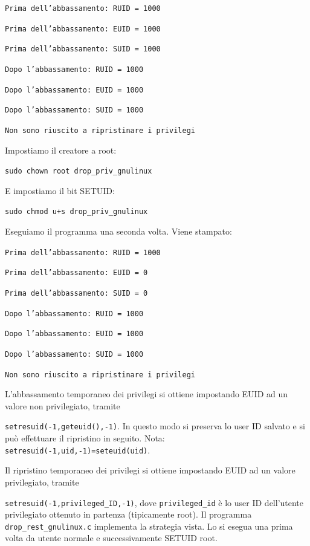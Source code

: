 \texttt{Prima dell’abbassamento: RUID = 1000}

\texttt{Prima dell’abbassamento: EUID = 1000}

\texttt{Prima dell’abbassamento: SUID = 1000}

\texttt{Dopo l’abbassamento: RUID = 1000}

\texttt{Dopo l’abbassamento: EUID = 1000
}

\texttt{Dopo l’abbassamento: SUID = 1000}

\texttt{Non sono riuscito a ripristinare i privilegi}

Impostiamo il creatore a root:
\begin{center}
    \texttt{sudo chown root drop\_priv\_gnulinux}
\end{center}
E impostiamo il bit SETUID:
\begin{center}
    \texttt{sudo chmod u+s drop\_priv\_gnulinux}
\end{center}
Eseguiamo il programma una seconda volta. Viene stampato:

\texttt{Prima dell’abbassamento: RUID = 1000}

\texttt{Prima dell’abbassamento: EUID = 0}

\texttt{Prima dell’abbassamento: SUID = 0}

\texttt{Dopo l’abbassamento: RUID = 1000 
}

\texttt{Dopo l’abbassamento: EUID = 1000}

\texttt{Dopo l’abbassamento: SUID = 1000}

\texttt{Non sono riuscito a ripristinare i privilegi}

L'abbassamento temporaneo dei privilegi si ottiene impostando EUID ad un valore non privilegiato, tramite

\texttt{setresuid(-1,geteuid(),-1)}. In questo modo si preserva lo user ID salvato e si può effettuare il ripristino in seguito. Nota: \texttt{setresuid(-1,uid,-1)=seteuid(uid)}.

Il ripristino temporaneo dei privilegi si ottiene impostando EUID ad un valore privilegiato, tramite

\texttt{setresuid(-1,privileged\_ID,-1)}, dove \texttt{privileged\_id} è lo user ID dell’utente
 privilegiato ottenuto in partenza
 (tipicamente root). Il programma \texttt{drop\_rest\_gnulinux.c}
implementa la strategia vista. Lo si esegua una prima volta da utente normale
e successivamente SETUID root.

